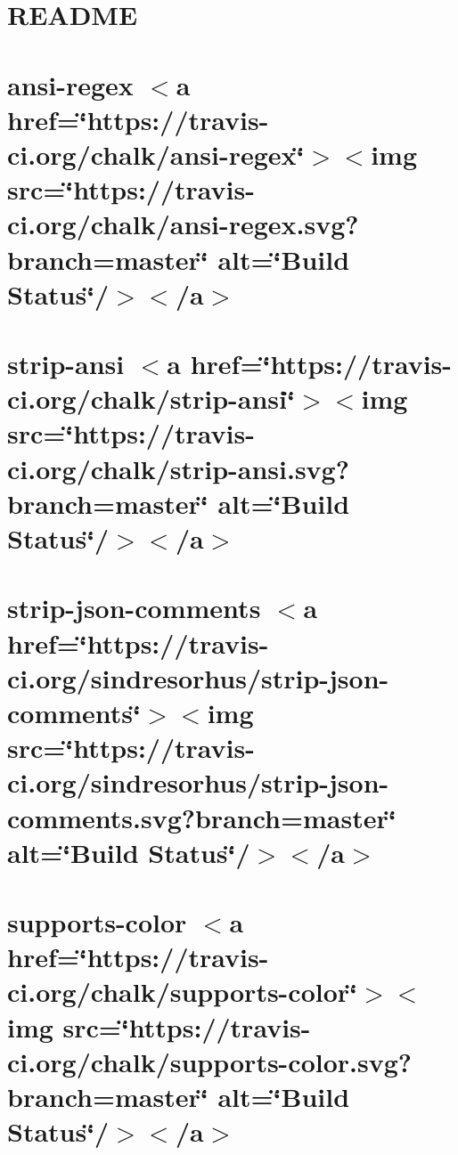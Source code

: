 \let\mypdfximage\pdfximage\def\pdfximage{\immediate\mypdfximage}\documentclass[twoside]{book}
\newcommand{\+}{\discretionary{\mbox{\scriptsize$\hookleftarrow$}}{}{}}
\begin{document}
\chapter{R\+E\+A\+D\+ME}
\label{md_heap-visualizer_node_modules_string_8prototype_8trimstart__r_e_a_d_m_e}

\chapter{ansi-\/regex $<$a href=\char`\"{}https\+://travis-\/ci.\+org/chalk/ansi-\/regex\char`\"{}$>$$<$img src=\char`\"{}https\+://travis-\/ci.\+org/chalk/ansi-\/regex.\+svg?branch=master\char`\"{} alt=\char`\"{}\+Build Status\char`\"{}/$>$$<$/a$>$}
\label{md_heap-visualizer_node_modules_strip-ansi_node_modules_ansi-regex_readme}

\chapter{strip-\/ansi $<$a href=\char`\"{}https\+://travis-\/ci.\+org/chalk/strip-\/ansi\char`\"{}$>$$<$img src=\char`\"{}https\+://travis-\/ci.\+org/chalk/strip-\/ansi.\+svg?branch=master\char`\"{} alt=\char`\"{}\+Build Status\char`\"{}/$>$$<$/a$>$}
\label{md_heap-visualizer_node_modules_strip-ansi_readme}

\chapter{strip-\/json-\/comments $<$a href=\char`\"{}https\+://travis-\/ci.\+org/sindresorhus/strip-\/json-\/comments\char`\"{}$>$$<$img src=\char`\"{}https\+://travis-\/ci.\+org/sindresorhus/strip-\/json-\/comments.\+svg?branch=master\char`\"{} alt=\char`\"{}\+Build Status\char`\"{}/$>$$<$/a$>$}
\label{md_heap-visualizer_node_modules_strip-json-comments_readme}

\chapter{supports-\/color $<$a href=\char`\"{}https\+://travis-\/ci.\+org/chalk/supports-\/color\char`\"{}$>$$<$img src=\char`\"{}https\+://travis-\/ci.\+org/chalk/supports-\/color.\+svg?branch=master\char`\"{} alt=\char`\"{}\+Build Status\char`\"{}/$>$$<$/a$>$}
\label{md_heap-visualizer_node_modules_supports-color_readme}

\end{document}
